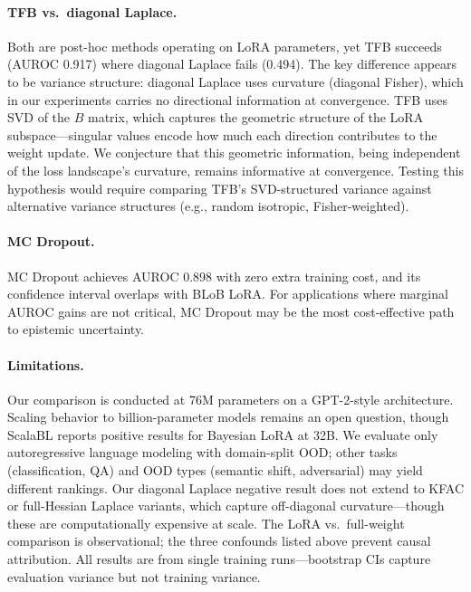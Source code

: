 \documentclass{article}
\begin{document}
\paragraph{TFB vs.\ diagonal Laplace.}
Both are post-hoc methods operating on LoRA parameters, yet TFB succeeds (AUROC 0.917) where diagonal Laplace fails (0.494). The key difference appears to be variance structure: diagonal Laplace uses curvature (diagonal Fisher), which in our experiments carries no directional information at convergence. TFB uses SVD of the $B$ matrix, which captures the geometric structure of the LoRA subspace---singular values encode how much each direction contributes to the weight update. We conjecture that this geometric information, being independent of the loss landscape's curvature, remains informative at convergence. Testing this hypothesis would require comparing TFB's SVD-structured variance against alternative variance structures (e.g., random isotropic, Fisher-weighted).

\paragraph{MC Dropout.}
MC Dropout \citep{gal2016dropout} achieves AUROC 0.898 with zero extra training cost, and its confidence interval overlaps with BLoB LoRA. For applications where marginal AUROC gains are not critical, MC Dropout may be the most cost-effective path to epistemic uncertainty.

\paragraph{Limitations.}
Our comparison is conducted at 76M parameters on a GPT-2-style architecture. Scaling behavior to billion-parameter models remains an open question, though ScalaBL \citep{samplawski2025scalable} reports positive results for Bayesian LoRA at 32B. We evaluate only autoregressive language modeling with domain-split OOD; other tasks (classification, QA) and OOD types (semantic shift, adversarial) may yield different rankings. Our diagonal Laplace negative result does not extend to KFAC or full-Hessian Laplace variants, which capture off-diagonal curvature---though these are computationally expensive at scale. The LoRA vs.\ full-weight comparison is observational; the three confounds listed above prevent causal attribution. All results are from single training runs---bootstrap CIs capture evaluation variance but not training variance.

\end{document}
